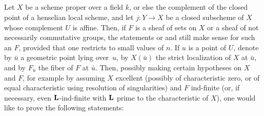 \subsection{} \label{XIV.6.2}
Let $X$ be a scheme proper over a field $k$, or else the complement of the closed point of a henselian local scheme, and let $j:Y \to X$ be a closed subscheme of $X$ whose complement $U$ is affine. Then, if $F$ is a sheaf of sets on $X$ or a sheaf of not necessarily commutative groups, the statements  or  and  still make sense for such an $F$, provided that one restricts to small values of $n$. If $u$ is a point of $U$, denote by $\bar{u}$ a geometric point lying over~$u$, by $X(\bar{u})$ the strict localization of $X$ at $\bar{u}$, and by $F_{\bar{u}}$ the fiber of $F$ at $\bar{u}$. Then, possibly making certain hypotheses on $X$ and $F$, for example by assuming $X$ excellent (possibly of characteristic zero, or of equal characteristic using resolution of singularities) and $F$ ind-finite (or, if necessary, even $\mathbf L$-ind-finite with $\mathbf L$ prime to the characteristic of $X$), one would like to prove the following statements:
